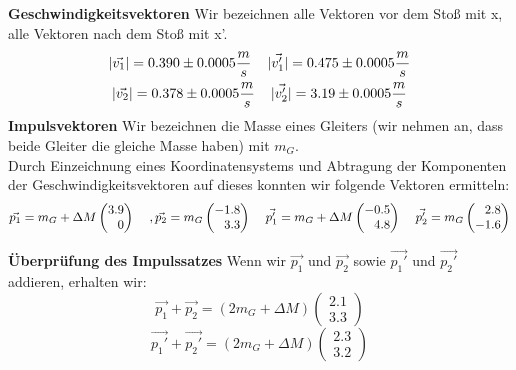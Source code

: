 \documentclass{article}
\begin{document}
\textbf{Geschwindigkeitsvektoren}
Wir bezeichnen alle Vektoren vor dem Stoß mit x, alle Vektoren nach dem Stoß mit x'.
\begin{gather}
|\vec{v_1}|=0.390 \pm 0.0005 \frac{m}{s} \hspace{0.4cm}
|\vec{v_1'}|=0.475 \pm 0.0005 \frac{m}{s}
\\
|\vec{v_2}|=0.378 \pm 0.0005 \frac{m}{s} \hspace{0.4cm}
|\vec{v_2'}|=3.19 \pm 0.0005 \frac{m}{s}
\end{gather}
\textbf{Impulsvektoren}
Wir bezeichnen die Masse eines Gleiters (wir nehmen an, dass beide Gleiter die gleiche Masse haben) mit $m_G$. \\
Durch Einzeichnung eines Koordinatensystems und Abtragung der Komponenten der Geschwindigkeitsvektoren auf dieses konnten wir folgende Vektoren ermitteln:
\begin{gather*}
\vec{p_1}=m_G+\Delta M
\begin{pmatrix*}[r]
3.9 \\ 0
\end{pmatrix*} \hspace{0.4cm}
, \vec{p_2}= 
m_G\begin{pmatrix*}[r]
-1.8 \\ 3.3
\end{pmatrix*}\hspace{0.4cm}
\vec{p_1'}=
m_G+\Delta M\begin{pmatrix*}[r]
-0.5 \\ 4.8
\end{pmatrix*}\hspace{0.4cm}
\vec{p_2'}=m_G\begin{pmatrix*}[r]
2.8 \\ -1.6
\end{pmatrix*} 
\end{gather*}

\textbf{Überprüfung des Impulssatzes}
Wenn wir $\vec{p_1}$ und $\vec{p_2}$ sowie $\vec{p_1'}$ und $\vec{p_2'}$ addieren, erhalten wir:
\begin{equation}\label{impuls1}
\vec{p_1}+\vec{p_2}=(2m_G+\Delta M )\begin{pmatrix}
2.1 \\ 3.3 
\end{pmatrix} 
\end{equation}
\begin{equation}\label{impuls2}
\vec{p_1'} + \vec{p_2'} =(2m_G +\Delta M )\begin{pmatrix}
2.3 \\
3.2
\end{pmatrix} 
\end{equation}
\end{document}
